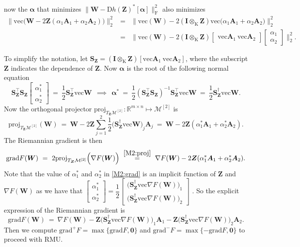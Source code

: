 \documentclass[sn-mathphys-num]{sn-jnl}
\def\grad            {\textrm{grad}}     %
\def\proj            {\textrm{proj}}     %
\def\zeros           {\bm{0}}            %
\def\IR  {\mathbb{R}} 	    %
\def\IRmn{\IR^{m \times n}} %
\def\A {\bm{A}}
\def\I {\bm{I}}
\def\S {\bm{S}}
\def\W {\bm{W}}
\def\Z {\bm{Z}}
\def\cM { \mathcal{M}}
\def\balpha   {\boldsymbol{\alpha}}
\begin{document}
now the $\balpha$ that minimizes 
$ \big\| \W - \textrm{D}h(\Z)^*[{\balpha}] \big\|_\textrm{F}^2$ also minimizes
\[
\begin{array}{lll}
 \Big\| \textrm{vec}\Big( 
\W - 2\Z(\alpha_1\A_1 + \alpha_2 \A_2)
\Big)
\Big\|_2^2
&=&
\displaystyle 
\Big\| \textrm{vec}(\W)  
- 2 (\I \otimes_{\text{K}} \Z ) \textrm{vec}
\Big(
\alpha_1 \A_1 + \alpha_2 \A_2
\Big)
\Big\|_2^2
\\
&=&\bigg\| \textrm{vec}( \W)  
- 2 (\I \otimes_{\text{K}} \Z ) 
\begin{bmatrix}
     \textrm{vec}\A_1 ~ \textrm{vec}\A_2
\end{bmatrix}
\begin{bmatrix}
\alpha_1
\\
\alpha_2
\end{bmatrix}
\bigg\|_2^2.
\end{array}
\]

To simplify the notation, let $\S_{\Z} = (\I \otimes_{\text{K}} \Z ) 
[\textrm{vec}\A_1 ~ \textrm{vec}\A_2]$, where the subscript $\Z$ indicates the dependence of $\Z$.
Now $\balpha$ is the root of the following normal equation 
\[
\S_{\Z}^\top \S_{\Z}
\begin{bmatrix}
    \alpha_1^*
    \\
    \alpha_2^*
\end{bmatrix}
~=~
\dfrac{1}{2}
\S_{\Z}^\top \textrm{vec}\W
~~\implies~~
\balpha^*
~=~
\dfrac{1}{2}(\S_{\Z}^\top\S_{\Z})^{-1}\S_{\Z}^\top
\textrm{vec}\W
~=~
\dfrac{1}{2}\S_{\Z}^\dagger
\textrm{vec}\W.
\]
Now the orthogonal projector $\proj_{T_{\Z}\cM^{[2]}}: \IRmn \mapsto \cM^{[2]}$ is 
\begin{equation}\label{M2:proj}
\proj_{T_{\Z}\cM^{[2]}}(\W)
~=~
\W-2\Z\sum_{j=1}^2
\dfrac{1}{2}\Big(\S_{\Z}^\dagger \textrm{vec}\W\Big)_j\A_j
~=~
\W  - 2 \Z (\alpha_1^* \A_1 + \alpha_2^* \A_2).
\end{equation}
The Riemannian gradient is then
\begin{equation}\label{M2:grad}
\grad F(\W)
~=~
2\proj_{T_{\Z}\cM^{[2]}}\Big( \nabla F(\W) \Big)
~\overset{\eqref{M2:proj}}{=}~
\nabla F(\W) - 2 \Z (\alpha_1^* \A_1 + \alpha_2^* \A_2).    
\end{equation}
Note that the value of $\alpha_1^*$ and $\alpha_2^*$ in
\eqref{M2:grad} 
is an implicit function of $\Z$ and $\nabla F(\W)$ as we have that
$
\begin{bmatrix}
\alpha_1^*
\\
\alpha_2^* 
\end{bmatrix}
=
 \dfrac{1}{2}
\begin{bmatrix}
\Big(
\S_{\Z}^\dagger
\textrm{vec}\nabla F(\W)
\Big)_1 
\\
\Big(
\S_{\Z}^\dagger
\textrm{vec}\nabla F(\W) 
\Big)_2
\end{bmatrix}
$
.
So the explicit expression of the Riemannian gradient is 
\[
\grad F(\W)
~=~
\nabla F(\W) - 
\Z
\Big(
\S_{\Z}^\dagger
\textrm{vec}\nabla F(\W)
\Big)_1  \A_1
-
\Z
\Big(
\S_{\Z}^\dagger
\textrm{vec}\nabla F(\W)
\Big)_2 \A_2
.
\]
Then we compute $\grad^+ F = \max\{\grad F, \zeros\}$ and $\grad^- F = \max\{-\grad F, \zeros\}$ to proceed with RMU.
\end{document}
